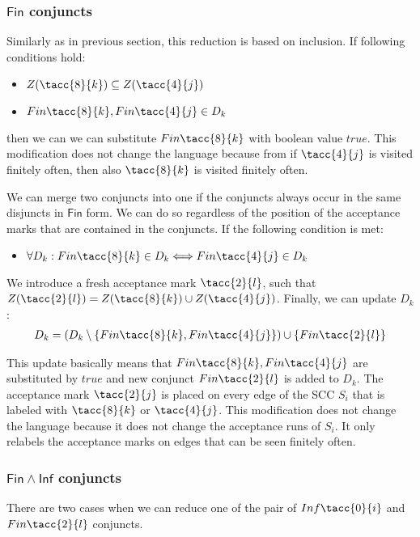 \documentclass[a4paper,UKenglish,cleveref, autoref, thm-restate]{lipics-v2021}
\def\Inf{\ensuremath{\mathsf{Inf}}}
\def\Fin{\ensuremath{\mathsf{Fin}}}
\def\true{\mathit{true}}
\begin{document}
\subsubsection{$\Fin$ conjuncts\\}
Similarly as in previous section, this reduction is based on inclusion.
If following conditions hold:
\begin{itemize}
    \item $Z(\tacc{8}{k}) \subseteq Z(\tacc{4}{j})$
    \item $\Fin\tacc{8}{k}, \Fin\tacc{4}{j} \in D_{k}$
\end{itemize}
then we can we can substitute $\Fin\tacc{8}{k}$ with boolean value $\true$. This modification does not change the language because from if $\tacc{4}{j}$ is visited finitely often, then also $\tacc{8}{k}$ is visited finitely often. 
\medskip

We can merge two conjuncts into one if the conjuncts always occur in the same disjuncts in $\Fin$ form. We can do so regardless of the position of the acceptance marks that are contained in the conjuncts. 
If the following condition is met:
\begin{itemize}
    \item $\forall D_{k}: \Fin\tacc{8}{k} \in D_{k} \Longleftrightarrow \Fin\tacc{4}{j} \in D_{k}$
\end{itemize}
We introduce a fresh acceptance mark $\tacc{2}{l}$, such that $Z(\tacc{2}{l}) = Z(\tacc{8}{k}) \cup Z(\tacc{4}{j})$.
 Finally, we can update $D_{k}$:
\begin{align*}
    D_{k} = (D_{k} \setminus \{ \Fin\tacc{8}{k}, \Fin\tacc{4}{j} \}) \cup \{\Fin\tacc{2}{l}\}
\end{align*}

This update basically means that $\Fin\tacc{8}{k}, \Fin\tacc{4}{j}$ are substituted by $\true$ and new conjunct $\Fin\tacc{2}{l}$ is added to $D_{k}$. The acceptance mark $\tacc{2}{j}$ is placed on every edge of the SCC $S_{i}$ that is labeled with $\tacc{8}{k}$ or $\tacc{4}{j}$.
This modification does not change the language because it does not change the acceptance runs of $S_{i}$. It only relabels the acceptance marks on edges that can be seen finitely often. 



\subsubsection{$\Fin \land \Inf$ conjuncts\\}
There are two cases when we can reduce one of the pair of $\Inf\tacc{0}{i}$ and $\Fin\tacc{2}{l}$ conjuncts.
\end{document}
